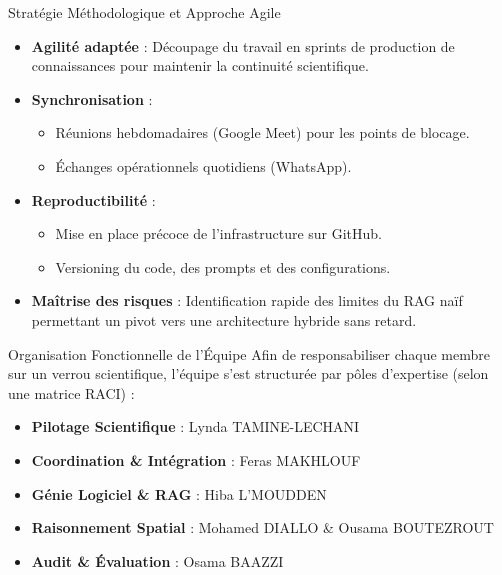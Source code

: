 \documentclass[aspectratio=169, 12pt]{beamer}
\begin{document}
\begin{frame}{Stratégie Méthodologique et Approche Agile}
    \begin{itemize}
        \item \textbf{Agilité adaptée} : Découpage du travail en sprints de production de connaissances pour maintenir la continuité scientifique.
        \item \textbf{Synchronisation} : 
        \begin{itemize}
            \item Réunions hebdomadaires (Google Meet) pour les points de blocage.
            \item Échanges opérationnels quotidiens (WhatsApp).
        \end{itemize}
        \item \textbf{Reproductibilité} :
        \begin{itemize}
            \item Mise en place précoce de l'infrastructure sur GitHub.
            \item Versioning du code, des prompts et des configurations.
        \end{itemize}
        \item \textbf{Maîtrise des risques} : Identification rapide des limites du RAG naïf permettant un pivot vers une architecture hybride sans retard.
    \end{itemize}
\end{frame}

\begin{frame}{Organisation Fonctionnelle de l'Équipe}
    Afin de responsabiliser chaque membre sur un verrou scientifique, l'équipe s'est structurée par pôles d'expertise (selon une matrice RACI) :
    \vspace{0.4cm}
    \begin{itemize}
        \item \textbf{Pilotage Scientifique} : Lynda TAMINE-LECHANI
        \item \textbf{Coordination \& Intégration} : Feras MAKHLOUF
        \item \textbf{Génie Logiciel \& RAG} : Hiba L'MOUDDEN
        \item \textbf{Raisonnement Spatial} : Mohamed DIALLO \& Ousama BOUTEZROUT
        \item \textbf{Audit \& Évaluation} : Osama BAAZZI
    \end{itemize}
\end{frame}
\end{document}
